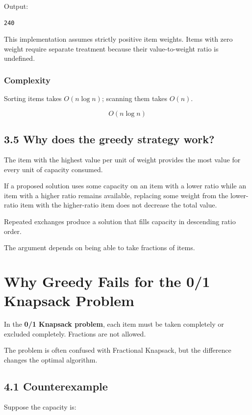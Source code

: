 Output:

\begin{lstlisting}[style=pseudocode]
240
\end{lstlisting}

This implementation assumes strictly positive item weights. Items with zero weight require separate treatment because their value-to-weight ratio is undefined.

\subsubsection{Complexity}

Sorting items takes $O(n\log n)$; scanning them takes $O(n)$.


\[
\boxed{O(n\log n)}
\]


\subsection{3.5 Why does the greedy strategy work?}

The item with the highest value per unit of weight provides the most value for every unit of capacity consumed.

If a proposed solution uses some capacity on an item with a lower ratio while an item with a higher ratio remains available, replacing some weight from the lower-ratio item with the higher-ratio item does not decrease the total value.

Repeated exchanges produce a solution that fills capacity in descending ratio order.

The argument depends on being able to take fractions of items.

\section{Why Greedy Fails for the 0/1 Knapsack Problem}

In the \textbf{0/1 Knapsack problem}, each item must be taken completely or excluded completely. Fractions are not allowed.

The problem is often confused with Fractional Knapsack, but the difference changes the optimal algorithm.

\subsection{4.1 Counterexample}

Suppose the capacity is:


